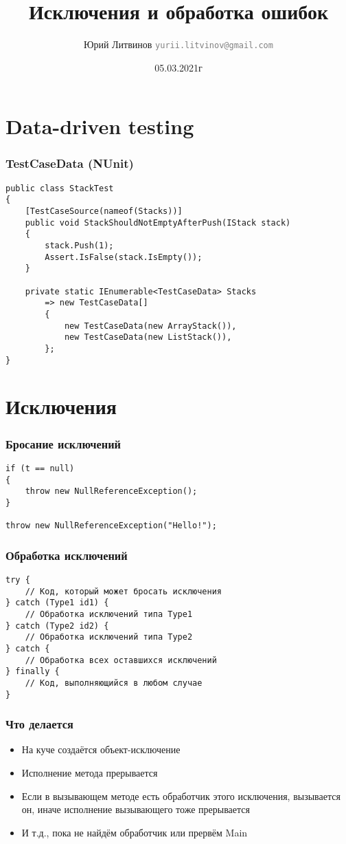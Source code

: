 \documentclass[xetex,mathserif,serif]{beamer}
\title{Исключения и обработка ошибок}
\author[Юрий Литвинов]{Юрий Литвинов \newline \textcolor{gray}{\small\texttt{yurii.litvinov@gmail.com}}}
\date{05.03.2021г}
\begin{document}
    
    \frame{\titlepage}

    \section{Data-driven testing}

    \begin{frame}[fragile]
        \frametitle{TestCaseData (NUnit)}
        \begin{verbatim}
public class StackTest
{
    [TestCaseSource(nameof(Stacks))]
    public void StackShouldNotEmptyAfterPush(IStack stack)
    {
        stack.Push(1);
        Assert.IsFalse(stack.IsEmpty());
    }

    private static IEnumerable<TestCaseData> Stacks
        => new TestCaseData[]
        {
            new TestCaseData(new ArrayStack()),
            new TestCaseData(new ListStack()),
        };
}
        \end{verbatim}
    \end{frame}

    \section{Исключения}

    \begin{frame}[fragile]
        \frametitle{Бросание исключений}
        \begin{verbatim}
if (t == null)
{
    throw new NullReferenceException();
}

throw new NullReferenceException("Hello!");
        \end{verbatim}
    \end{frame}

    \begin{frame}[fragile]
        \frametitle{Обработка исключений}
        \begin{verbatim}
try {
    // Код, который может бросать исключения
} catch (Type1 id1) {
    // Обработка исключений типа Type1
} catch (Type2 id2) {
    // Обработка исключений типа Type2
} catch {
    // Обработка всех оставшихся исключений
} finally {
    // Код, выполняющийся в любом случае
}
        \end{verbatim}
    \end{frame}

    \begin{frame}
        \frametitle{Что делается}
        \begin{itemize}
            \item На куче создаётся объект-исключение
            \item Исполнение метода прерывается
            \item Если в вызывающем методе есть обработчик этого исключения, вызывается он, иначе исполнение вызывающего тоже прерывается
            \item И т.д., пока не найдём обработчик или прервём Main
        \end{itemize}
    \end{frame}
\end{document}
